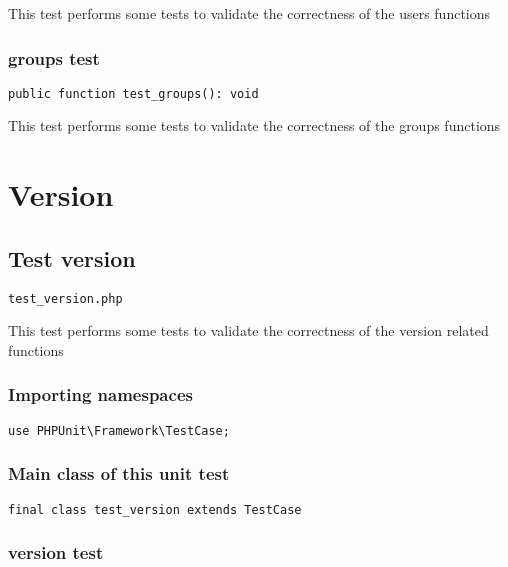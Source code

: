 \documentclass[a4paper]{article}
\begin{document}
This test performs some tests to validate the correctness
of the users functions

\hypertarget{toc418}{}
\subsubsection{groups test}

\begin{lstlisting}
public function test_groups(): void
\end{lstlisting}

This test performs some tests to validate the correctness
of the groups functions


\hypertarget{toc419}{}
\section{Version}

\hypertarget{toc420}{}
\subsection{Test version}

\begin{lstlisting}
test_version.php
\end{lstlisting}

This test performs some tests to validate the correctness
of the version related functions

\hypertarget{toc421}{}
\subsubsection{Importing namespaces}

\begin{lstlisting}
use PHPUnit\Framework\TestCase;
\end{lstlisting}

\hypertarget{toc422}{}
\subsubsection{Main class of this unit test}

\begin{lstlisting}
final class test_version extends TestCase
\end{lstlisting}

\hypertarget{toc423}{}
\subsubsection{version test}
\end{document}
